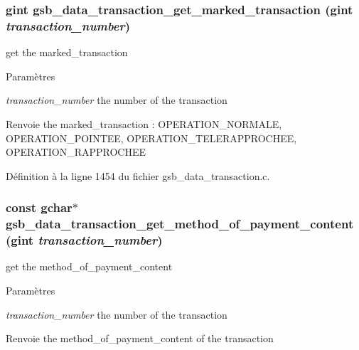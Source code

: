 \subsubsection[{gsb\_\-data\_\-transaction\_\-get\_\-marked\_\-transaction}]{\setlength{\rightskip}{0pt plus 5cm}gint gsb\_\-data\_\-transaction\_\-get\_\-marked\_\-transaction (gint {\em transaction\_\-number})}\label{gsb__data__transaction_8h_a52cf9684818c3930c5c688b54f7cf393}
get the marked\_\-transaction


\begin{DoxyParams}{Paramètres}
\item[{\em transaction\_\-number}]the number of the transaction\end{DoxyParams}
\begin{DoxyReturn}{Renvoie}
the marked\_\-transaction : OPERATION\_\-NORMALE, OPERATION\_\-POINTEE, OPERATION\_\-TELERAPPROCHEE, OPERATION\_\-RAPPROCHEE 
\end{DoxyReturn}


Définition à la ligne 1454 du fichier gsb\_\-data\_\-transaction.c.

\subsubsection[{gsb\_\-data\_\-transaction\_\-get\_\-method\_\-of\_\-payment\_\-content}]{\setlength{\rightskip}{0pt plus 5cm}const gchar$\ast$ gsb\_\-data\_\-transaction\_\-get\_\-method\_\-of\_\-payment\_\-content (gint {\em transaction\_\-number})}\label{gsb__data__transaction_8h_a018a31b8a8fe99e813b4876206cf59a1}
get the method\_\-of\_\-payment\_\-content


\begin{DoxyParams}{Paramètres}
\item[{\em transaction\_\-number}]the number of the transaction \end{DoxyParams}
\begin{DoxyReturn}{Renvoie}
the method\_\-of\_\-payment\_\-content of the transaction 
\end{DoxyReturn}


